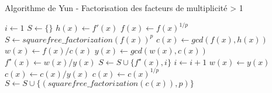 \begin{algorithm}
  \caption{Algorithme de Yun - Factorisation des facteurs de multiplicit\'e > 1}
  \begin{algorithmic}[1]
    \Statex
      \State $i \gets 1$
      \State $S \gets \{\}$
      \State $h(x) \gets f'(x)$
        \State $f(x) \gets f(x)^{1/p}$
        \State $S \gets squarefree\_factorization(f(x))^p$
      \Else
        \State $c(x) \gets gcd(f(x), h(x))$
        \State $w(x) \gets f(x)/c(x)$
          \State $y(x) \gets gcd(w(x), c(x))$
          \State $f^{\star}(x) \gets w(x)/y(x)$
          \State $S \gets S \cup \{f^{\star} (x), i\}$
          \State $i \gets i+1$
          \State $w(x) \gets y(x)$
          \State $c(x) \gets c(x)/y(x)$
        \EndWhile
          \State $c(x) \gets c(x)^{1/p}$
          \State $S \gets S \cup \{(squarefree\_factorization(c(x)),p)\} $
        \EndIf
      \EndIf
      \State {}
    \EndFunction
  \end{algorithmic}
\end{algorithm}
